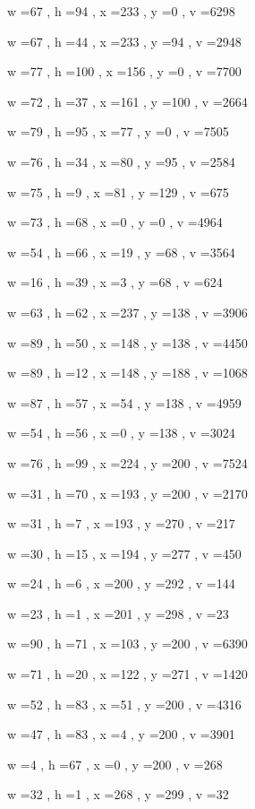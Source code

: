 \documentclass[11pt]{article}
\begin{document}
w =67 , h =94 , x =233 , y =0 , v =6298
\par
w =67 , h =44 , x =233 , y =94 , v =2948
\par
w =77 , h =100 , x =156 , y =0 , v =7700
\par
w =72 , h =37 , x =161 , y =100 , v =2664
\par
w =79 , h =95 , x =77 , y =0 , v =7505
\par
w =76 , h =34 , x =80 , y =95 , v =2584
\par
w =75 , h =9 , x =81 , y =129 , v =675
\par
w =73 , h =68 , x =0 , y =0 , v =4964
\par
w =54 , h =66 , x =19 , y =68 , v =3564
\par
w =16 , h =39 , x =3 , y =68 , v =624
\par
w =63 , h =62 , x =237 , y =138 , v =3906
\par
w =89 , h =50 , x =148 , y =138 , v =4450
\par
w =89 , h =12 , x =148 , y =188 , v =1068
\par
w =87 , h =57 , x =54 , y =138 , v =4959
\par
w =54 , h =56 , x =0 , y =138 , v =3024
\par
w =76 , h =99 , x =224 , y =200 , v =7524
\par
w =31 , h =70 , x =193 , y =200 , v =2170
\par
w =31 , h =7 , x =193 , y =270 , v =217
\par
w =30 , h =15 , x =194 , y =277 , v =450
\par
w =24 , h =6 , x =200 , y =292 , v =144
\par
w =23 , h =1 , x =201 , y =298 , v =23
\par
w =90 , h =71 , x =103 , y =200 , v =6390
\par
w =71 , h =20 , x =122 , y =271 , v =1420
\par
w =52 , h =83 , x =51 , y =200 , v =4316
\par
w =47 , h =83 , x =4 , y =200 , v =3901
\par
w =4 , h =67 , x =0 , y =200 , v =268
\par
w =32 , h =1 , x =268 , y =299 , v =32
\par
\newpage
\end{document}
